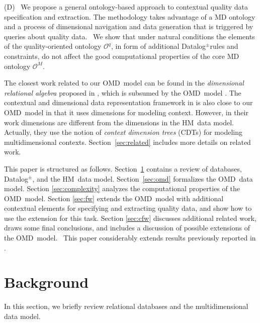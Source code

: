\documentclass[format=acmsmall, review=false, screen=true]{acmart}
\newcommand{\ignore}[1]{}
\newcommand{\mc}[1]{\mathcal{ #1}}
\newcommand{\dpm}{{Datalog}$^\pm$}
\newcommand{\omd}{OMD}
\newcommand{\hm}{HM}
\newcommand{\red}[1]{{#1}}
\begin{document}
 \vspace{1mm}
\noindent (D) \ We propose a general ontology-based approach to contextual quality data specification and extraction. The methodology takes advantage of  a MD ontology and a process of  dimensional navigation and data generation that is triggered by queries about quality data. \ We show that under natural conditions the elements of the quality-oriented ontology $\mc{O}^q$, in form of additional \dpm rules and constraints, do not affect the good computational
    properties of the core MD ontology $\mc{O}^M$.


\vspace{2mm}
The closest work related to our \omd \ model can be found in the {\em dimensional relational algebra} proposed in \cite{\ignore{martinenghi-qa,martinenghi-er,}martinenghi-vldb}, which is subsumed by the \omd \ model \cite[chap. 4]{milaniThesis}. The contextual and dimensional data representation framework in \cite{bolchini-is} is also close to our \omd \ model in that it uses dimensions for modeling context. However, in their work dimensions are different from the dimensions in the \hm \ data model. Actually, they use the notion of {\em context dimension trees} (CDTs) for modeling multidimensional contexts. \red{Section~\ref{sec:related} includes more details on related work.}


This paper is structured as follows. Section~\ref{sec:background} contains a review of databases,  \dpm, and the \hm \ data model. Section~\ref{sec:omd}  formalizes the \omd \ data model. Section \ref{sec:complexity} analyzes the computational properties of the \omd \ model. Section \ref{sec:fw} extends the \omd \ model with additional contextual elements for specifying and extracting quality data, and show how to use the extension for this task. Section \ref{sec:cfw} discusses additional related work, draws some final conclusions, and includes a discussion of  possible extensions of the \omd \ model. \
This paper considerably extends results previously reported in \cite{milani15ruleml}.


\section{Background} \label{sec:background}

In this section, we briefly review relational databases and the multidimensional data model.
\end{document}
